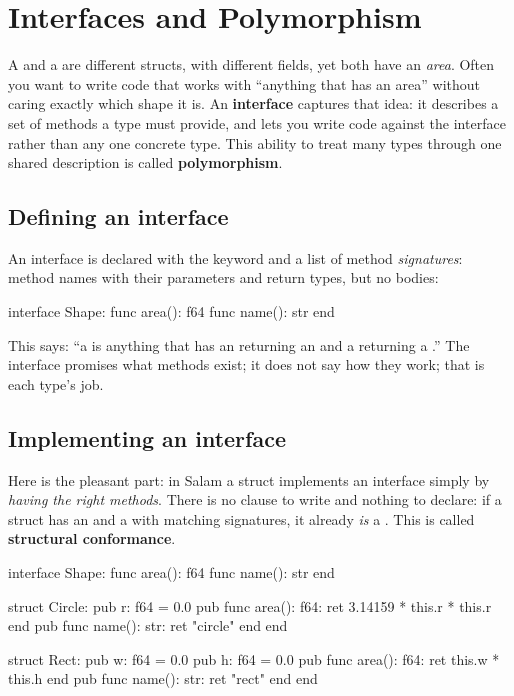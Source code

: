 \chapter{Interfaces and Polymorphism}%
\label{ch:interfaces}

A  and a  are different structs, with different fields,
yet both have an \emph{area}. Often you want to write code that works with
``anything that has an area'' without caring exactly which shape it is. An
\textbf{interface} captures that idea: it describes a set of methods a type must
provide, and lets you write code against the interface rather than any one
concrete type. This ability to treat many types through one shared description is
called \textbf{polymorphism}.

\section{Defining an interface}

An interface is declared with the  keyword and a list of method
\emph{signatures}: method names with their parameters and return types, but no
bodies:

\begin{salamen}
interface Shape:
    func area(): f64
    func name(): str
end
\end{salamen}

This says: ``a  is anything that has an  returning an
 and a  returning a .'' The interface promises
what methods exist; it does not say how they work; that is each type's job.

\section{Implementing an interface}

Here is the pleasant part: in Salam a struct implements an interface simply by
\emph{having the right methods}. There is no  clause to write and
nothing to declare: if a struct has an  and a  with
matching signatures, it already \emph{is} a . This is called
\textbf{structural conformance}.

\begin{salamen}
interface Shape:
    func area(): f64
    func name(): str
end

struct Circle:
    pub r: f64 = 0.0
    pub func area(): f64: ret 3.14159 * this.r * this.r end
    pub func name(): str: ret "circle" end
end

struct Rect:
    pub w: f64 = 0.0
    pub h: f64 = 0.0
    pub func area(): f64: ret this.w * this.h end
    pub func name(): str: ret "rect" end
end
\end{salamen}

